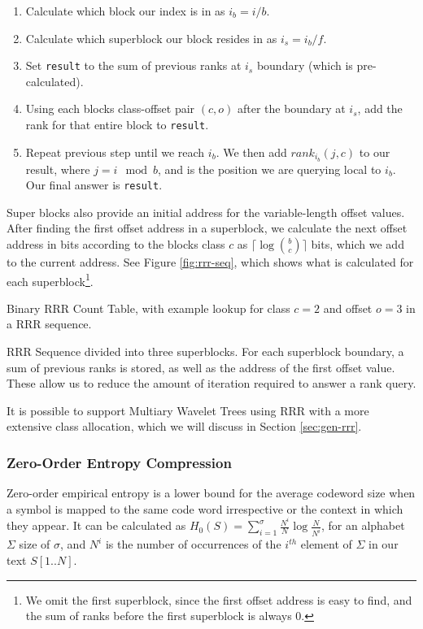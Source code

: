 \begin{enumerate}
	\item
		Calculate which block our index is in as $i_b = i / b$.
	\item
		Calculate which superblock our block resides in as $i_s = i_b / f$.
	\item
		Set \texttt{result} to the sum of previous ranks at $i_s$ boundary (which is 
		pre-calculated).
	\item
		Using each blocks class-offset pair $(c, o)$ after the boundary at 
		$i_s$, add the rank for that entire block to \texttt{result}.
	\item
		Repeat previous step until we reach $i_b$. We then add $rank_{i_b}(j, 
		c)$ to our result, where $j = i \mod b$, and is the position we are 
		querying local to $i_b$. Our final answer is \texttt{result}.
\end{enumerate}

Super blocks also provide an initial address for the variable-length offset 
values. After finding the first offset address in a superblock, we calculate the 
next offset address in bits according to the blocks class $c$ as $\lceil\log 
{b \choose c}\rceil$ bits, which we add to the current address. See Figure 
\ref{fig:rrr-seq}, which shows what is calculated for each 
superblock\footnote{We omit the first superblock, since the first offset address 
is easy to find, and the sum of ranks before the first superblock is always 
$0$.}.

		{Binary RRR Count Table, with example lookup for class $c = 2$
		and offset $o = 3$ in a RRR sequence.}

		{RRR Sequence divided into three superblocks. For each superblock
		boundary, a sum of previous ranks is stored, as well as the address
		of the first offset value. These allow us to reduce the amount of 
		iteration required to answer a rank query.}

It is possible to support Multiary Wavelet Trees using RRR with a more extensive 
class allocation, which we will discuss in Section \ref{sec:gen-rrr}.

\subsubsection{Zero-Order Entropy Compression}
\label{sec:entropy}
Zero-order empirical entropy is a lower bound for the average codeword size
when a symbol is mapped to the same code word irrespective or the context in
which they appear. It can be calculated as $H_0(S) = \sum_{i = 1}^{\sigma}
\frac{N^i}{N} \log \frac{N}{N^i}$, for an alphabet $\Sigma$ size of $\sigma$, 
and $N^i$ is the number of occurrences of the $i^{th}$ element of $\Sigma$ in 
our text $S[1..N]$. 



